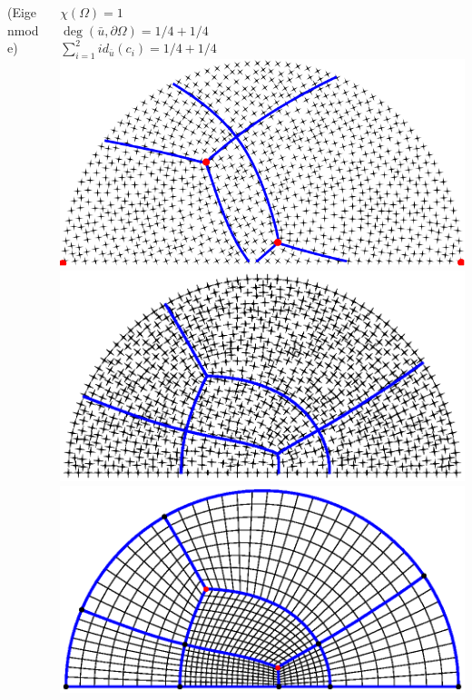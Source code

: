 \documentclass[compress,10pt,aspectratio=169]{beamer}
\begin{document}
\begin{frame}
\begin{columns}
\begin{column}{0.4\textwidth}
    \scriptsize {\color{onera_gray}(Eigenmode)}
\end{column}
\pause
\begin{column}{0.4\textwidth}
    \centering
    \scriptsize
    $\chi(\Omega)=1$\\\vspace{0.1cm}
    $\deg(\bar{u}, \partial\Omega) = 1/4+1/4$\\\vspace{0.1cm}
    $\sum_{i=1}^{2} id_{\bar{u}}(c_i)=1/4+1/4$\\\vspace{0.1cm}
    \includegraphics[scale=0.32]{images/demiDiscGinzNonAligne.pdf}\\\vspace{0.1cm}
    \includegraphics[scale=0.32]{images/demiDiscGinzAligne.eps}\\\vspace{0.1cm}
    \includegraphics[scale=0.32]{images/demiDiscMail.eps.eps}\\

\end{column}
\end{columns}
\end{frame}
\end{document}
